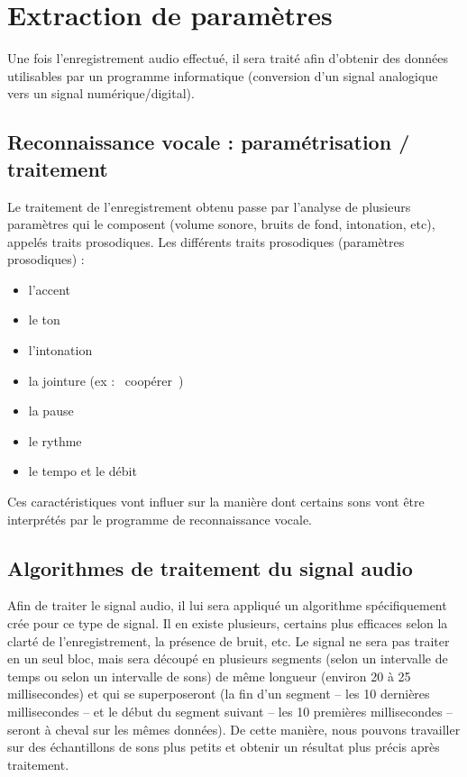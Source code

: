 \documentclass[a4paper, 12pt]{book}
\newcounter{program}[subsection]
\begin{document}

\section{Extraction de paramètres}

Une fois l'enregistrement audio effectué, il sera traité afin d'obtenir des données utilisables par un programme informatique (conversion d'un signal analogique vers un signal numérique/digital).

\subsection{Reconnaissance vocale : paramétrisation / traitement}

Le traitement de l'enregistrement obtenu passe par l'analyse de plusieurs paramètres qui le composent (volume sonore, bruits de fond, intonation, etc), appelés traits prosodiques. Les différents traits prosodiques (paramètres prosodiques) :

\begin{itemize}
    \item l'accent 
    \item le ton 
    \item l'intonation 
    \item la jointure (ex : \guillemotleft{}~coopérer~\guillemotright{}) 
    \item la pause 
    \item le rythme
    \item le tempo et le débit
\end{itemize}

Ces caractéristiques vont influer sur la manière dont certains sons vont être interprétés par le programme de reconnaissance vocale.

\subsection{Algorithmes de traitement du signal audio}

Afin de traiter le signal audio, il lui sera appliqué un algorithme spécifiquement crée pour ce type de signal. Il en existe plusieurs, certains plus efficaces selon la clarté de l'enregistrement, la présence de bruit, etc. Le signal ne sera pas traiter en un seul bloc, mais sera découpé en plusieurs segments (selon un intervalle de temps ou selon un intervalle de sons) de même longueur (environ 20 à 25 millisecondes) et qui se superposeront (la fin d'un segment – les 10 dernières millisecondes – et le début du segment suivant – les 10 premières millisecondes – seront à cheval sur les mêmes données). De cette manière, nous pouvons travailler sur des échantillons de sons plus petits et obtenir un résultat plus précis après traitement.
\end{document}
